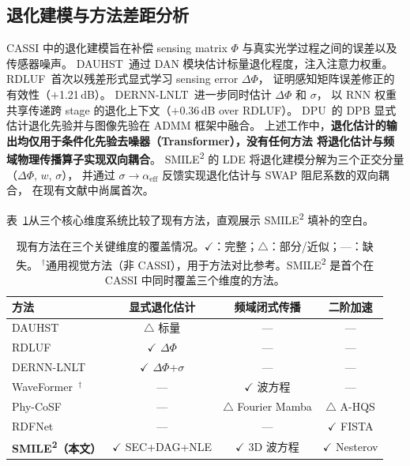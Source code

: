 \documentclass[a4paper,11pt,twocolumn]{ctexart}
\newcommand{\smiletwo}{SMILE\textsuperscript{2}}
\newcommand{\swap}{\textsc{SWAP}}
\newcommand{\lde}{\textsc{LDE}}
\newcommand{\secm}{\textsc{SEC}}
\newcommand{\dag}{\textsc{DAG}}
\newcommand{\nle}{\textsc{NLE}}
\newcommand{\alphaEff}{\alpha_{\mathrm{eff}}}
\begin{document}
\subsection{退化建模与方法差距分析}

CASSI 中的退化建模旨在补偿 sensing matrix $\Phi$ 与真实光学过程之间的误差以及传感器噪声。
DAUHST~\citep{cai2022dauhst}通过 DAN 模块估计标量退化程度，注入注意力权重。
RDLUF~\citep{dong2023rdluf}首次以残差形式显式学习 sensing error $\Delta\Phi$，
证明感知矩阵误差修正的有效性（$+$1.21\,dB）。
DERNN-LNLT~\citep{dong2024dernnlnlt}进一步同时估计 $\Delta\Phi$ 和 $\sigma$，
以 RNN 权重共享传递跨 stage 的退化上下文（$+$0.36\,dB over RDLUF）。
DPU~\citep{zhang2024dpu}的 DPB 显式估计退化先验并与图像先验在 ADMM 框架中融合。
上述工作中，\textbf{退化估计的输出均仅用于条件化先验去噪器（Transformer），没有任何方法
将退化估计与频域物理传播算子实现双向耦合}。
\smiletwo{} 的 \lde{} 将退化建模分解为三个正交分量（$\Delta\Phi$, $w$, $\sigma$），
并通过 $\sigma \to \alphaEff$ 反馈实现退化估计与 \swap{} 阻尼系数的双向耦合，
在现有文献中尚属首次。

表~\ref{tab:gap}从三个核心维度系统比较了现有方法，直观展示 \smiletwo{} 填补的空白。

\begin{table}[t]
\centering
\caption{现有方法在三个关键维度的覆盖情况。$\checkmark$：完整；$\triangle$：部分/近似；—：缺失。
$^\dagger$通用视觉方法（非 CASSI），用于方法对比参考。\smiletwo{} 是首个在 CASSI 中同时覆盖三个维度的方法。}
\label{tab:gap}
\small
\setlength{\tabcolsep}{4pt}
\begin{tabular}{l|ccc}
\toprule
方法 & 显式退化估计 & 频域闭式传播 & 二阶加速 \\
\midrule
DAUHST~\citep{cai2022dauhst}        & $\triangle$ 标量 & — & — \\
RDLUF~\citep{dong2023rdluf}          & $\checkmark$ $\Delta\Phi$ & — & — \\
DERNN-LNLT~\citep{dong2024dernnlnlt} & $\checkmark$ $\Delta\Phi$+$\sigma$ & — & — \\
WaveFormer~\citep{shu2026waveformer}$^\dagger$ & — & $\checkmark$ 波方程 & — \\
Phy-CoSF~\citep{chen2026phycosf}    & — & $\triangle$ Fourier Mamba & $\triangle$ A-HQS \\
RDFNet~\citep{zhou2023rdfnet}        & — & — & $\checkmark$ FISTA \\
\midrule
\textbf{\smiletwo{}（本文）} & $\checkmark$ \secm{}+\dag{}+\nle{} & $\checkmark$ 3D 波方程 & $\checkmark$ Nesterov \\
\bottomrule
\end{tabular}
\end{table}
\end{document}
